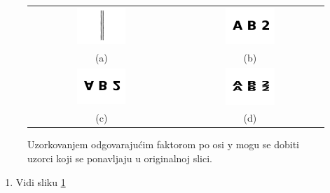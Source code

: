\documentclass[12pt, a4]{report}
\begin{document}
            \begin{figure}
                \centering
                \begin{tabular}{cc}
                    \includegraphics[width=0.35\textwidth]{ab2} & \includegraphics[width=0.35\textwidth]{ab21} \\
                    (a) & (b) \\
                    \includegraphics[width=0.35\textwidth]{ab22} & \includegraphics[width=0.35\textwidth]{ab23} \\
                    (c) & (d)
                \end{tabular}
                \caption{Uzorkovanjem odgovarajućim faktorom po osi y mogu se dobiti uzorci koji se ponavljaju u originalnoj slici.}    
                \label{fig:moire}
            \end{figure}
            \begin{enumerate}
                \item Vidi sliku \ref{fig:moire}
            \end{enumerate}
    
\end{document}
